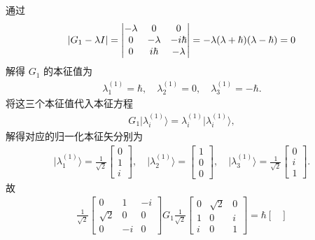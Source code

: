 \documentclass{assignment}
\begin{document}
\begin{pf}
    通过
    \begin{align}
        \left\lvert G_1-\lambda I\right\rvert=\begin{vmatrix}
            -\lambda&0&0\\
            0&-\lambda&-i\hbar\\
            0&i\hbar&-\lambda
        \end{vmatrix}=-\lambda(\lambda+\hbar)(\lambda-\hbar)=0
    \end{align}
    解得 $G_1$ 的本征值为
    \begin{align}
        \lambda_1^{(1)}=\hbar,\quad\lambda_2^{(1)}=0,\quad\lambda_3^{(1)}=-\hbar.
    \end{align}
    将这三个本征值代入本征方程
    \begin{align}
        G_1\lvert\lambda_i^{(1)}\rangle=\lambda_i^{(1)}\lvert\lambda_i^{(1)}\rangle,
    \end{align}
    解得对应的归一化本征矢分别为
    \begin{align}
        \lvert\lambda_1^{(1)}\rangle=\frac{1}{\sqrt{2}}\begin{bmatrix}
            0\\
            1\\
            i
        \end{bmatrix},\quad\lvert\lambda_2^{(1)}\rangle=\begin{bmatrix}
            1\\
            0\\
            0
        \end{bmatrix},\quad\lvert\lambda_3^{(1)}\rangle=\frac{1}{\sqrt{2}}\begin{bmatrix}
            0\\
            i\\
            1
        \end{bmatrix}.
    \end{align}
    故
    \begin{align}
        \frac{1}{\sqrt{2}}\begin{bmatrix}
            0&1&-i\\
            \sqrt{2}&0&0\\
            0&-i&0
        \end{bmatrix}G_1\frac{1}{\sqrt{2}}\begin{bmatrix}
            0&\sqrt{2}&0\\
            1&0&i\\
            i&0&1
        \end{bmatrix}=\hbar\begin{bmatrix}

\end{bmatrix}
\end{align}
\end{pf}
\end{document}
